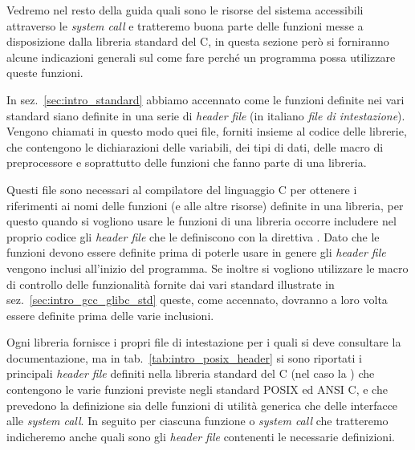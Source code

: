 Vedremo nel resto della guida quali sono le risorse del sistema accessibili
attraverso le \textit{system call} e tratteremo buona parte delle funzioni
messe a disposizione dalla libreria standard del C, in questa sezione però si
forniranno alcune indicazioni generali sul come fare perché un programma possa
utilizzare queste funzioni.


In sez.~\ref{sec:intro_standard} abbiamo accennato come le funzioni definite
nei vari standard siano definite in una serie di \textit{header file} (in
italiano \textsl{file di intestazione}).  Vengono chiamati in questo modo quei
file, forniti insieme al codice delle librerie, che contengono le
dichiarazioni delle variabili, dei tipi di dati, delle macro di preprocessore
e soprattutto delle funzioni che fanno parte di una libreria.

Questi file sono necessari al compilatore del linguaggio C per ottenere i
riferimenti ai nomi delle funzioni (e alle altre risorse) definite in una
libreria, per questo quando si vogliono usare le funzioni di una libreria
occorre includere nel proprio codice gli \textit{header file} che le
definiscono con la direttiva . Dato che le funzioni devono
essere definite prima di poterle usare in genere gli \textit{header file}
vengono inclusi all'inizio del programma. Se inoltre si vogliono utilizzare le
macro di controllo delle funzionalità fornite dai vari standard illustrate in
sez.~\ref{sec:intro_gcc_glibc_std} queste, come accennato, dovranno a loro
volta essere definite prima delle varie inclusioni.

Ogni libreria fornisce i propri file di intestazione per i quali si deve
consultare la documentazione, ma in tab.~\ref{tab:intro_posix_header} si sono
riportati i principali \textit{header file} definiti nella libreria standard
del C (nel caso la ) che contengono le varie funzioni previste
negli standard POSIX ed ANSI C, e che prevedono la definizione sia delle
funzioni di utilità generica che delle interfacce alle \textit{system call}. In
seguito per ciascuna funzione o \textit{system call} che tratteremo
indicheremo anche quali sono gli \textit{header file} contenenti le necessarie
definizioni.

